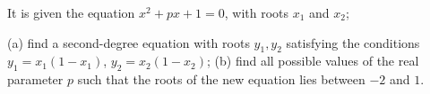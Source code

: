 It is given the equation $x^2+px+1=0$, with roots $x_1$ and $x_2$;

(a) find a second-degree equation with roots $y_1,y_2$ satisfying the conditions $y_1=x_1(1-x_1)$, $y_2=x_2(1-x_2)$;
(b) find all possible values of the real parameter $p$ such that the roots of the new equation lies between $-2$ and $1$.